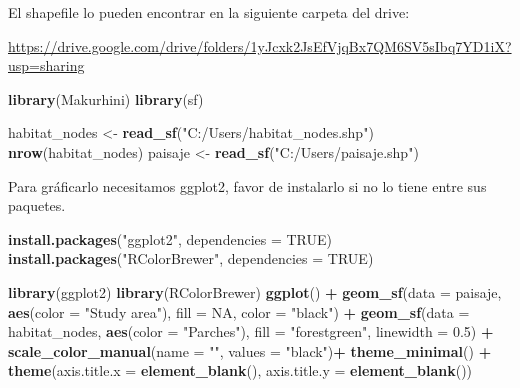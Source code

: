 \documentclass[
]{book}
\newenvironment{Shaded}{\begin{snugshade}}{\end{snugshade}}
\newcommand{\AttributeTok}[1]{\textcolor[rgb]{0.13,0.29,0.53}{#1}}
\newcommand{\ConstantTok}[1]{\textcolor[rgb]{0.56,0.35,0.01}{#1}}
\newcommand{\FloatTok}[1]{\textcolor[rgb]{0.00,0.00,0.81}{#1}}
\newcommand{\FunctionTok}[1]{\textcolor[rgb]{0.13,0.29,0.53}{\textbf{#1}}}
\newcommand{\NormalTok}[1]{#1}
\newcommand{\OtherTok}[1]{\textcolor[rgb]{0.56,0.35,0.01}{#1}}
\newcommand{\SpecialCharTok}[1]{\textcolor[rgb]{0.81,0.36,0.00}{\textbf{#1}}}
\newcommand{\StringTok}[1]{\textcolor[rgb]{0.31,0.60,0.02}{#1}}
\begin{document}
El shapefile lo pueden encontrar en la siguiente carpeta del drive:

\url{https://drive.google.com/drive/folders/1yJcxk2JsEfVjqBx7QM6SV5sIbq7YD1iX?usp=sharing}

\begin{Shaded}
\begin{Highlighting}[]
\FunctionTok{library}\NormalTok{(Makurhini)}
\FunctionTok{library}\NormalTok{(sf)}

\NormalTok{habitat\_nodes }\OtherTok{\textless{}{-}} \FunctionTok{read\_sf}\NormalTok{(}\StringTok{"C:/Users/habitat\_nodes.shp"}\NormalTok{)}
\FunctionTok{nrow}\NormalTok{(habitat\_nodes)}
\NormalTok{paisaje }\OtherTok{\textless{}{-}} \FunctionTok{read\_sf}\NormalTok{(}\StringTok{"C:/Users/paisaje.shp"}\NormalTok{)}
\end{Highlighting}
\end{Shaded}

Para gráficarlo necesitamos ggplot2, favor de instalarlo si no lo tiene entre sus paquetes.

\begin{Shaded}
\begin{Highlighting}[]
\FunctionTok{install.packages}\NormalTok{(}\StringTok{"ggplot2"}\NormalTok{, }\AttributeTok{dependencies =} \ConstantTok{TRUE}\NormalTok{)}
\FunctionTok{install.packages}\NormalTok{(}\StringTok{"RColorBrewer"}\NormalTok{, }\AttributeTok{dependencies =} \ConstantTok{TRUE}\NormalTok{)}
\end{Highlighting}
\end{Shaded}

\begin{Shaded}
\begin{Highlighting}[]
\FunctionTok{library}\NormalTok{(ggplot2)}
\FunctionTok{library}\NormalTok{(RColorBrewer)}
\FunctionTok{ggplot}\NormalTok{() }\SpecialCharTok{+}  
  \FunctionTok{geom\_sf}\NormalTok{(}\AttributeTok{data =}\NormalTok{ paisaje, }\FunctionTok{aes}\NormalTok{(}\AttributeTok{color =} \StringTok{"Study area"}\NormalTok{), }\AttributeTok{fill =} \ConstantTok{NA}\NormalTok{, }\AttributeTok{color =} \StringTok{"black"}\NormalTok{) }\SpecialCharTok{+}
  \FunctionTok{geom\_sf}\NormalTok{(}\AttributeTok{data =}\NormalTok{ habitat\_nodes, }\FunctionTok{aes}\NormalTok{(}\AttributeTok{color =} \StringTok{"Parches"}\NormalTok{), }\AttributeTok{fill =} \StringTok{"forestgreen"}\NormalTok{, }\AttributeTok{linewidth =} \FloatTok{0.5}\NormalTok{) }\SpecialCharTok{+}
  \FunctionTok{scale\_color\_manual}\NormalTok{(}\AttributeTok{name =} \StringTok{""}\NormalTok{, }\AttributeTok{values =} \StringTok{"black"}\NormalTok{)}\SpecialCharTok{+}
  \FunctionTok{theme\_minimal}\NormalTok{() }\SpecialCharTok{+}
  \FunctionTok{theme}\NormalTok{(}\AttributeTok{axis.title.x =} \FunctionTok{element\_blank}\NormalTok{(),}
        \AttributeTok{axis.title.y =} \FunctionTok{element\_blank}\NormalTok{())}
\end{Highlighting}
\end{Shaded}
\end{document}

